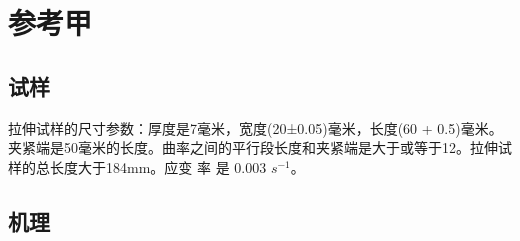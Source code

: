 
\section{参考甲}
\subsection{试样}
拉伸试样的尺寸参数：厚度是7毫米，宽度(20±0.05)毫米，长度(60 + 0.5)毫米。夹紧端是50毫米的长度。曲率之间的平行段长度和夹紧端是大于或等于12。拉伸试样的总长度大于184mm。应变 率 是 0.003 $ s^{-1} $。
\newpage
\subsection{机理}
%

